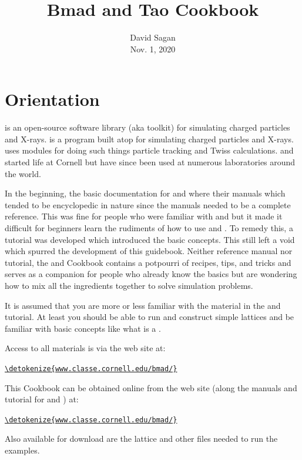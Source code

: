\documentclass{hitec}     %
\title{Bmad and Tao Cookbook}
\author{}
\date{David Sagan \\ Nov. 1, 2020}
\newcommand{\Section}[1]{\section{#1}\vspace*{-1ex}}
\newenvironment{display}
  {\vspace*{-1.5ex} \begin{alltt}}
  {\end{alltt} \vspace*{-1.0ex}}
\begin{document}
{}
\maketitle

\cleardoublepage
{}
{}
\tableofcontents

\newpage

\Section{Orientation}
\label{s:orient}

\bmad is an open-source software library (aka toolkit) for simulating charged particles and X-rays.
\tao is a program built atop \bmad for simulating charged particles and X-rays. \tao uses \bmad
modules for doing such things particle tracking and Twiss calculations. \tao and \bmad started life
at Cornell but have since been used at numerous laboratories around the world.

In the beginning, the basic documentation for \bmad and \tao where their manuals which tended to be
encyclopedic in nature since the manuals needed to be a complete reference. This was fine for people
who were familiar with \bmad and \tao but it made it difficult for beginners learn the rudiments of
how to use \bmad and \tao. To remedy this, a tutorial was developed which introduced the basic
concepts. This still left a void which spurred the development of this guidebook. Neither reference
manual nor tutorial, the \bmad and \tao Cookbook contains a potpourri of recipes, tips, and tricks
and serves as a companion for people who already know the basics but are wondering how to mix all
the ingredients together to solve simulation problems.

It is assumed that you are more or less familiar with the material in the \bmad and \tao
tutorial. At least you should be able to run \tao and construct simple lattices and be familiar with
basic concepts like what is a . 

Access to all materials is via the \bmad web site at:
\begin{display}
  \url{\detokenize{www.classe.cornell.edu/bmad/}}
\end{display}

This Cookbook can be obtained online from the \bmad web site (along the manuals and tutorial for
\bmad and \tao) at:
\begin{display}
  \url{\detokenize{www.classe.cornell.edu/bmad/}}
\end{display}
Also available for download are the lattice and other files needed to run the examples.
\end{document}
